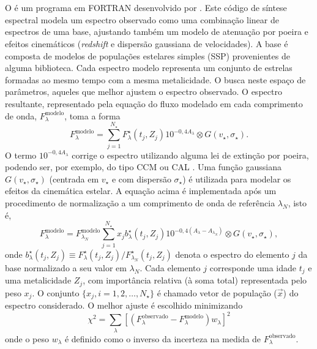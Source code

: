 \section{\STARLIGHT}
\label{sec:sample:SL}

O \starlight é um programa em FORTRAN desenvolvido por \citet{CidFernandes.etal.2005a}. Este código de síntese espectral modela um espectro observado como uma combinação linear de espectros de uma base, ajustando também um modelo de atenuação por poeira e efeitos cinemáticos ({\em redshift} e dispersão gaussiana de velocidades). A base é composta de modelos de populações estelares simples (SSP) provenientes de alguma biblioteca. Cada espectro modelo representa um conjunto de estrelas formadas ao mesmo tempo com a mesma metalicidade. O \starlight busca neste espaço de parâmetros, aqueles que melhor ajustem o espectro observado. O espectro resultante, representado pela equação do fluxo modelado em cada comprimento de onda, $F^{\mathrm{modelo}}_\lambda$, toma a forma
\begin{equation}
  F^{\mathrm{modelo}}_\lambda = \sum_{j=1}^{N_\star} F^\star_\lambda(t_j,Z_j) 10^{ -0,4 A_\lambda}  \otimes G(v_\star,\sigma_\star).
\end{equation}
\noindent O termo $10^{ -0,4 A_\lambda}$ corrige o espectro utilizando alguma lei de extinção por poeira, podendo ser, por exemplo, do tipo CCM \citep{CCM1989a} ou CAL \citep{Calzetti.etal.1994a}. Uma função gaussiana $G(v_\star,\sigma_\star)$ (centrada em $v_\star$ e com dispersão $\sigma_\star$) é utilizada para modelar os efeitos da cinemática estelar. A equação acima é implementada após um procedimento de normalização a um comprimento de onda de referência $\lambda_N$, isto é,
\begin{equation}
F^{\mathrm{modelo}}_\lambda = F^{\mathrm{modelo}}_{\lambda_N} \sum_{j=1}^{N_\star} x_j b^\star_\lambda(t_j,Z_j) 10^{ -0,4 (A_\lambda - A_{\lambda_N}) } \otimes G(v_\star,\sigma_\star),
\end{equation}
\noindent onde $b^\star_\lambda(t_j,Z_j) \equiv  F^\star_\lambda(t_j,Z_j) / F^\star_{\lambda_N}(t_j,Z_j)$ denota o espectro  do elemento $j$ da base normalizado a seu valor em $\lambda_N$. Cada elemento $j$ corresponde uma idade  $t_j$ e uma metalicidade $Z_j$, com importância relativa (à soma total) representada pelo peso $x_j$. O conjunto $\{x_j, i=1,2,\ldots,N_\star\}$ é chamado vetor de população ($\vec{x}$) do espectro considerado. O melhor ajuste é escolhido minimizando
\begin{equation}
\chi^2 = \sum_\lambda \left[(F^{\mathrm{observado}}_\lambda - F^{\mathrm{modelo}}_\lambda) w_\lambda\right]^2
\end{equation}
\noindent onde o peso $w_\lambda$ é definido como o inverso da incerteza na medida de $F_\lambda^{\mathrm{observado}}$.

